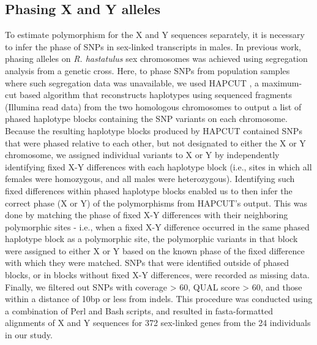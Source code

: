 \documentclass[9pt,twocolumn,twoside]{gsajnl}
\begin{document}
\subsection*{Phasing X and Y alleles}
To estimate polymorphism for the X and Y sequences separately, it is necessary to infer the phase of SNPs in sex-linked transcripts in males. In previous work, phasing alleles on \textit{R. hastatulus} sex chromosomes was achieved using segregation analysis from a genetic cross. Here, to phase SNPs from population samples where such segregation data was unavailable, we used HAPCUT \citep{bansal2008hapcut}, a maximum-cut based algorithm that reconstructs haplotypes using sequenced fragments (Illumina read data) from the two homologous chromosomes to output a list of phased haplotype blocks containing the SNP variants on each chromosome. Because the resulting haplotype blocks produced by HAPCUT contained SNPs that were phased relative to each other, but not designated to either the X or Y chromosome, we assigned individual variants to X or Y by independently identifying fixed X-Y differences with each haplotype block (i.e., sites in which all females were homozygous, and all males were heterozygous). Identifying such fixed differences within phased haplotype blocks enabled us to then infer the correct phase (X or Y) of the polymorphisms from HAPCUT’s output. This was done by matching the phase of fixed X-Y differences with their neighboring polymorphic sites - i.e., when a fixed X-Y difference occurred in the same phased haplotype block as a polymorphic site, the polymorphic variants in that block were assigned to either X or Y based on the known phase of the fixed difference with which they were matched. SNPs that were identified outside of phased blocks, or in blocks without fixed X-Y differences, were recorded as missing data. Finally, we filtered out SNPs with coverage > 60, QUAL score > 60, and those within a distance of 10bp or less from indels. This procedure was conducted using a combination of Perl and Bash scripts, and resulted in fasta-formatted alignments of X and Y sequences for 372 sex-linked genes from the 24 individuals in our study.
\end{document}

